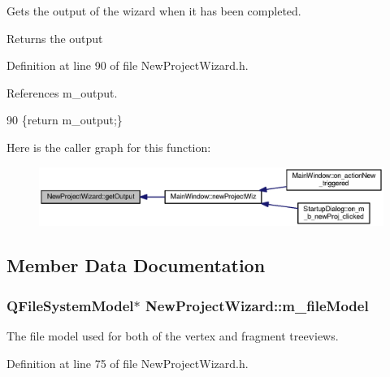 Gets the output of the wizard when it has been completed. 

\begin{DoxyReturn}{Returns}
the output 
\end{DoxyReturn}


Definition at line 90 of file New\-Project\-Wizard.\-h.



References m\-\_\-output.


\begin{DoxyCode}
90 \{\textcolor{keywordflow}{return} m_output;\}
\end{DoxyCode}


Here is the caller graph for this function\-:\nopagebreak
\begin{figure}[H]
\begin{center}
\leavevmode
\includegraphics[width=350pt]{class_new_project_wizard_a8509f28c39e33090710fcfa7452fee35_icgraph}
\end{center}
\end{figure}




\subsection{Member Data Documentation}
\subsubsection[{m\-\_\-file\-Model}]{\setlength{\rightskip}{0pt plus 5cm}Q\-File\-System\-Model$\ast$ New\-Project\-Wizard\-::m\-\_\-file\-Model}\label{class_new_project_wizard_a1a7a96c9f8dfc69602c45ce8ec4ac750}


The file model used for both of the vertex and fragment treeviews. 



Definition at line 75 of file New\-Project\-Wizard.\-h.

